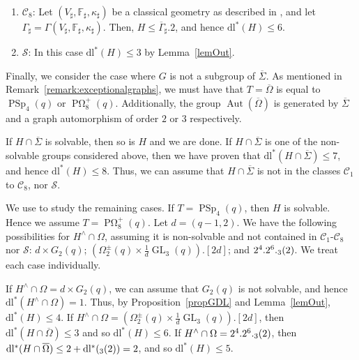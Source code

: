 \documentclass[11pt]{amsart}
\numberwithin{equation}{section}
\theoremstyle{definition}
\theoremstyle{remark}
\newcommand{\Aut}{\mathop{\mathrm{Aut}}}
\DeclareMathOperator{\GL}{GL}
\newcommand{\PSp}{\mathop{\mathrm{PSp}}}
\newcommand{\dll}{\mathrm{dl^*}}
\let\L\relax
\DeclareMathOperator{\L}{L}
\DeclareMathOperator{\POmega}{P \Omega}
\begin{document}
\begin{enumerate}
    \item $\mathscr C_8$: Let $(V_\sharp, \mathbb{F}_\sharp, \kappa_\sharp)$ be a classical geometry as described in \cite[Sec.~4.8]{KL90}, and let $\Gamma_\sharp = \Gamma(V_\sharp, \mathbb{F}_\sharp, \kappa_\sharp)$. Then, $H \leqslant \overline \Gamma_\sharp . 2$, and hence $\dll(H) \leq 6$.
    
    \item $\mathscr S$: In this case $\dll(H) \leq 3$ by Lemma~\ref{lemOut}.
\end{enumerate}

Finally, we consider the case where $G$ is not a subgroup of $\overline \Sigma$. As mentioned in Remark~\ref{remark:exceptionalgraphs}, we must have that $T =  \overline \Omega$ is equal to $\PSp_4(q)$ or $\POmega_8^+(q)$. Additionally, the group $\Aut(\overline \Omega)$ is generated by $\overline \Sigma$ and a graph automorphism of order $2$ or $3$ respectively. 

If $H \cap \overline \Sigma$ is solvable, then so is $H$ and we are done. If $H \cap \overline \Sigma$ is one of the non-solvable groups considered above, then we have proven that $\dll(H \cap \overline \Sigma) \leq 7$, and hence $\dll(H) \leq 8$. Thus, we can assume that $H \cap \overline \Sigma$ is not in the classes $\mathscr{C}_1$ to $\mathscr{C}_8$, nor $\mathscr{S}$.

We use \cite{BHR13} to study the remaining cases.
If $T = \PSp_4(q)$, then $H$ is solvable.
Hence we assume $T = \POmega_8^+(q)$. Let $d=(q-1,2)$.
We have the following possibilities for $H^{\wedge} \cap \Omega$, assuming it is non-solvable and not contained in $\mathscr C_1$-$\mathscr C_8$ nor $\mathscr S$: $d \times G_2(q)$; $(\Omega_2^\pm(q) \times \frac{1}{d} \GL_3(q)).[2d]$; and $2^4.2^6.\L_3(2)$. We treat each case individually.

If $H^\wedge \cap \Omega = d \times G_2(q)$, we can assume that $G_2(q)$ is not solvable, and hence $\dll(H^{\wedge} \cap \Omega) =1$. Thus, by Proposition~\ref{propGDL} and Lemma~\ref{lemOut}, $\dll(H) \leq 4$.
If $H^\wedge \cap \Omega = (\Omega_2^\pm(q) \times \frac{1}{d} \GL_3(q)).[2d]$, then $\dll(H \cap \overline \Omega) \leq 3$ and so $\dll(H) \leq 6$. If $H^\wedge \cap \Omega = 2^4.2^6.\L_3(2)$, then $\dll(H \cap \overline\Omega) \leq 2 + \dll(\L_3(2)) = 2$, and so $\dll(H) \leq 5$.\\
\end{document}

